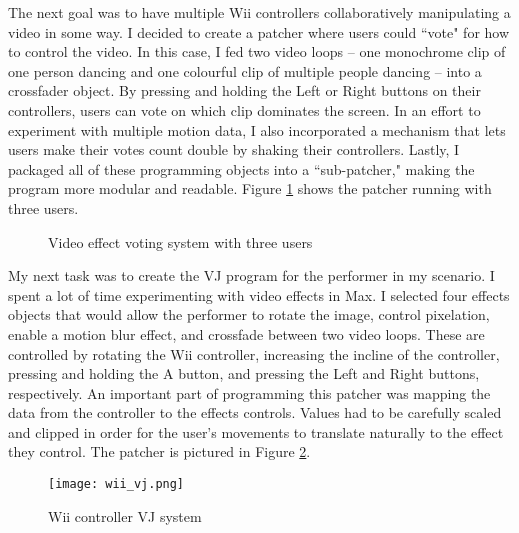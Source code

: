 The next goal was to have multiple Wii controllers collaboratively manipulating a video in some way. I decided to create a patcher where users could ``vote" for how to control the video. In this case, I fed two video loops -- one monochrome clip of one person dancing and one colourful clip of multiple people dancing -- into a crossfader object. By pressing and holding the Left or Right buttons on their controllers, users can vote on which clip dominates the screen. In an effort to experiment with multiple motion data, I also incorporated a mechanism that lets users make their votes count double by shaking their controllers. Lastly, I packaged all of these programming objects into a ``sub-patcher," making the program more modular and readable. Figure \ref{prototyping4} shows the patcher running with three users.

\begin{figure}[t]
	\centering

	\hspace{1cm}
	\caption{Video effect voting system with three users}

	\label{prototyping4}
\end{figure}

My next task was to create the VJ program for the performer in my scenario. I spent a lot of time experimenting with video effects in Max. I selected four effects objects that would allow the performer to rotate the image, control pixelation, enable a motion blur effect, and crossfade between two video loops. These are controlled by rotating the Wii controller, increasing the incline of the controller, pressing and holding the A button, and pressing the Left and Right buttons, respectively. An important part of programming this patcher was mapping the data from the controller to the effects controls. Values had to be carefully scaled and clipped in order for the user's movements to translate naturally to the effect they control. The patcher is pictured in Figure \ref{prototyping5}.

\begin{figure}[t]
	\centering

	\texttt{[image: wii\_vj.png]}
	\caption{Wii controller VJ system}

	\label{prototyping5}
\end{figure}

